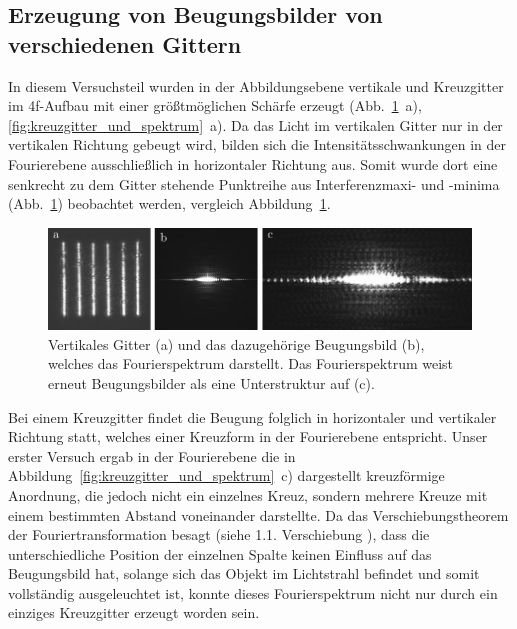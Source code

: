 \subsection{Erzeugung von Beugungsbilder von verschiedenen Gittern}

In diesem Versuchsteil wurden in der Abbildungsebene vertikale und Kreuzgitter im 4f-Aufbau mit einer größtmöglichen Schärfe erzeugt (Abb.~\ref{fig:gitter_und_spektrum}~a), \ref{fig:kreuzgitter_und_spektrum}~a). %
Da das Licht im vertikalen Gitter nur in der vertikalen Richtung gebeugt wird, bilden sich die Intensitätsschwankungen in der Fourierebene ausschließlich in horizontaler Richtung aus. Somit wurde dort eine senkrecht zu dem Gitter stehende Punktreihe aus Interferenzmaxi- und -minima (Abb.~\ref{fig:gitter_und_spektrum}) beobachtet werden, vergleich Abbildung~\ref{fig:gitter_und_spektrum}.
	
\begin{figure}[ht]
	\centering
	\includegraphics{images/Regina/abb13.pdf}
	\caption[Gitter mit Fourierspektrum]{
		Vertikales Gitter (a) und das dazugehörige Beugungsbild (b), welches das Fourierspektrum darstellt. Das Fourierspektrum weist erneut Beugungsbilder als eine Unterstruktur auf (c).
	}
	\label{fig:gitter_und_spektrum}
\end{figure}


Bei einem Kreuzgitter findet die Beugung folglich in horizontaler und vertikaler Richtung statt, welches einer Kreuzform in der Fourierebene entspricht. Unser erster Versuch ergab in der Fourierebene die in Abbildung~\ref{fig:kreuzgitter_und_spektrum}~c) dargestellt kreuzförmige Anordnung, die jedoch nicht ein einzelnes Kreuz, sondern mehrere Kreuze mit einem bestimmten Abstand voneinander darstellte. Da das Verschiebungstheorem der Fouriertransformation besagt (siehe 1.1. Verschiebung%
), dass die unterschiedliche Position der einzelnen Spalte keinen Einfluss auf das Beugungsbild hat, solange sich das Objekt im Lichtstrahl befindet und somit vollständig ausgeleuchtet ist, konnte dieses Fourierspektrum nicht nur durch ein einziges Kreuzgitter erzeugt worden sein. 

